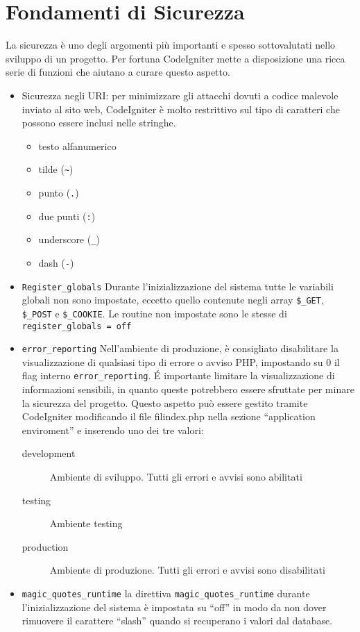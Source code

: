 \section{Fondamenti di Sicurezza}
\label{cap:sicurezza}

La sicurezza è uno degli argomenti più importanti e spesso sottovalutati nello sviluppo di un progetto. Per fortuna CodeIgniter mette a disposizione una ricca serie di funzioni che aiutano a curare questo aspetto.

\begin{itemize}
\item Sicurezza negli URI: per minimizzare gli attacchi dovuti a codice malevole inviato al sito web, CodeIgniter è molto restrittivo sul tipo di caratteri che possono essere inclusi nelle stringhe.

\begin{itemize}
\item testo alfanumerico
\item tilde (\verb|~|)
\item punto (\verb|.|)
\item due punti (\verb|:|)
\item underscore (\verb|_|)
\item dash (\verb|-|)
\end{itemize}

\item \verb|Register_globals|
Durante l'inizializzazione del sistema tutte le variabili globali non sono impostate, eccetto quello contenute negli array \verb|$_GET|, \verb|$_POST| e \verb|$_COOKIE|. Le routine non impostate sono le stesse di \verb|register_globals = off|

\item \verb|error_reporting|
Nell'ambiente di produzione, è consigliato disabilitare la visualizzazione di qualsiasi tipo di errore o avviso \ac{PHP}, impostando su 0 il flag interno  \verb|error_reporting|. \'E importante limitare la visualizzazione di informazioni sensibili, in quanto queste potrebbero essere sfruttate per minare la sicurezza del progetto. Questo aspetto può essere gestito tramite CodeIgniter modificando il file fil{index.php} nella sezione ``application enviroment'' e inserendo uno dei tre valori:

\begin{description}
\item [development] Ambiente di sviluppo. Tutti gli errori e avvisi sono abilitati
\item [testing] Ambiente testing
\item [production] Ambiente di produzione. Tutti gli errori e avvisi sono disabilitati
\end{description}

\item \verb|magic_quotes_runtime| la direttiva \verb|magic_quotes_runtime| durante l'inizializzazione del sistema è impostata su ``off'' in modo da non dover rimuovere il carattere ``slash'' quando si recuperano i valori dal database.
\end{itemize}

